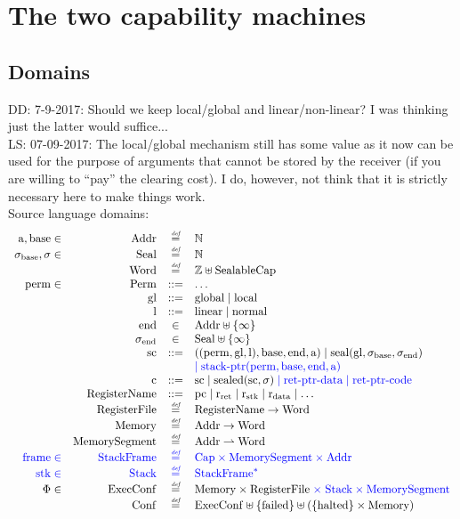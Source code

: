 \documentclass[a4paper]{article}
\newcommand\lau[1]{{\color{purple} \sf \footnotesize {LS: #1}}\\}
\newcommand\dominique[1]{{\color{purple} \sf \footnotesize {DD: #1}}\\}
\newcommand{\defeq}{\stackrel{\textit{\tiny{def}}}{=}}
\newcommand{\defbnf}{::=}
\newcommand{\fun}{\rightarrow}
\newcommand{\parfun}{\rightharpoonup}
\newcommand{\sourcecolor}[1]{\color{blue}}
\newcommand{\src}[1]{{\sourcecolor{} #1}}
\newcommand{\nats}{\mathbb{N}}
\newcommand{\ints}{\mathbb{Z}}
\newcommand{\shareddom}[1]{\mathrm{#1}}
\newcommand{\RegName}{\shareddom{RegisterName}}
\newcommand{\Addr}{\shareddom{Addr}}
\newcommand{\Seal}{\shareddom{Seal}}
\newcommand{\Perm}{\shareddom{Perm}}
\newcommand{\Caps}{\shareddom{Cap}}
\newcommand{\SealableCaps}{\shareddom{SealableCap}}
\newcommand{\Word}{\shareddom{Word}}
\newcommand{\Mem}{\shareddom{Memory}}
\newcommand{\Reg}{\shareddom{RegisterFile}}
\newcommand{\Conf}{\shareddom{Conf}}
\newcommand{\ExecConf}{\shareddom{ExecConf}}
\newcommand{\MemSeg}{\shareddom{MemorySegment}}
\newcommand{\StkFrame}{\shareddom{StackFrame}}
\newcommand{\Stack}{\shareddom{Stack}}
\newcommand{\scbnf}{\shareddom{sc}}
\newcommand{\cbnf}{\shareddom{c}}
\newcommand{\permbnf}{\shareddom{perm}}
\newcommand{\addrbnf}{\shareddom{a}}
\newcommand{\basebnf}{\shareddom{base}}
\newcommand{\aendbnf}{\shareddom{end}}
\newcommand{\glbnf}{\shareddom{gl}}
\newcommand{\linbnf}{\shareddom{l}}
\newcommand{\sealbasebnf}{\sigma_\shareddom{base}}
\newcommand{\sealendbnf}{\sigma_\shareddom{end}}
\newcommand{\sstk}{\shareddom{stk}}
\newcommand{\sstkframe}{\shareddom{frame}}
\newcommand{\stkptr}[1]{\mathrm{stack\text{-}ptr}(#1)}
\newcommand{\retptrd}{\mathrm{ret\text{-}ptr\text{-}data}}
\newcommand{\retptrc}{\mathrm{ret\text{-}ptr\text{-}code}}
\newcommand{\seal}[1]{\shareddom{seal}(#1)}
\newcommand{\sealed}[1]{\shareddom{sealed}(#1)}
\newcommand{\failed}{\mathrm{failed}}
\newcommand{\halted}{\mathrm{halted}}
\newcommand{\pcreg}{\mathrm{pc}}
\newcommand{\rstk}{\mathrm{r}_\mathrm{stk}}
\newcommand{\rO}{\mathrm{r}_\mathrm{ret}}
\newcommand{\rret}{\rO}
\newcommand{\rdata}{\mathrm{r}_\mathrm{data}}
\newcommand{\plainlocality}[1]{\mathrm{#1}}
\newcommand{\glob}{\plainlocality{global}}
\newcommand{\local}{\plainlocality{local}}
\newcommand{\plainlinearity}[1]{\mathrm{#1}}
\newcommand{\linear}{\plainlinearity{linear}}
\newcommand{\normal}{\plainlinearity{normal}}
\begin{document}
\section{The two capability machines}
\subsection{Domains}
\label{sec:domains}

\dominique{7-9-2017: Should we keep local/global and linear/non-linear?  I was thinking just the latter would suffice...}
\lau{07-09-2017: The local/global mechanism still has some value as it now can be used for the purpose of arguments that cannot be stored by the receiver (if you are willing to ``pay'' the clearing cost). I do, however, not think that it is strictly necessary here to make things work.}
Source language domains:
\[
  \begin{array}{rrcl}
   \addrbnf,\basebnf \in & \Addr & \defeq & \nats \\
    \sealbasebnf, \sigma \in & \Seal & \defeq & \nats \\
    &\Word & \defeq & \ints \uplus \SealableCaps\\
    \permbnf \in& \Perm & \defbnf & \dots \\
    &\glbnf & \defbnf & \glob \mid \local \\
    &\linbnf & \defbnf & \linear \mid \normal \\
    &\aendbnf & \in & \Addr \uplus \{\infty \} \\
    &\sealendbnf & \in & \Seal \uplus \{\infty \} \\
    &\scbnf &\defbnf & ((\permbnf,\glbnf,\linbnf),\basebnf,\aendbnf,\addrbnf) \mid \seal{\glbnf,\sealbasebnf,\sealendbnf}\\
    & & & {\sourcecolor{} \mid \stkptr{\permbnf,\basebnf,\aendbnf,\addrbnf}}\\ 
    &\cbnf & \defbnf &  \scbnf \mid \sealed{\scbnf,\sigma}{\sourcecolor{} \; \mid \retptrd \mid \retptrc}\\ 
    &\RegName & \defbnf &\pcreg \mid \rret \mid \rstk \mid \rdata \mid \dots \\
    &\Reg & \defeq & \RegName \fun \Word\\
    &\Mem & \defeq & \Addr \fun \Word \\
    &\MemSeg & \defeq & \Addr \parfun \Word \\
    {\sourcecolor{} \sstkframe \in} & {\sourcecolor{} \StkFrame} & {\sourcecolor{} \defeq} & {\sourcecolor{} \Caps \times \MemSeg \times \Addr}\\
    \src{\sstk \in}& \src{ \Stack} & \src{ \defeq} & \src{ \StkFrame^*} \\
    \Phi \in & \ExecConf & \defeq & \Mem \times \Reg {\sourcecolor{} \; \times \; \Stack \times \MemSeg }\\
    &\Conf & \defeq & \ExecConf \uplus \{\failed\} \uplus (\{\halted\} \times \Mem)
  \end{array}
\]
\end{document}
